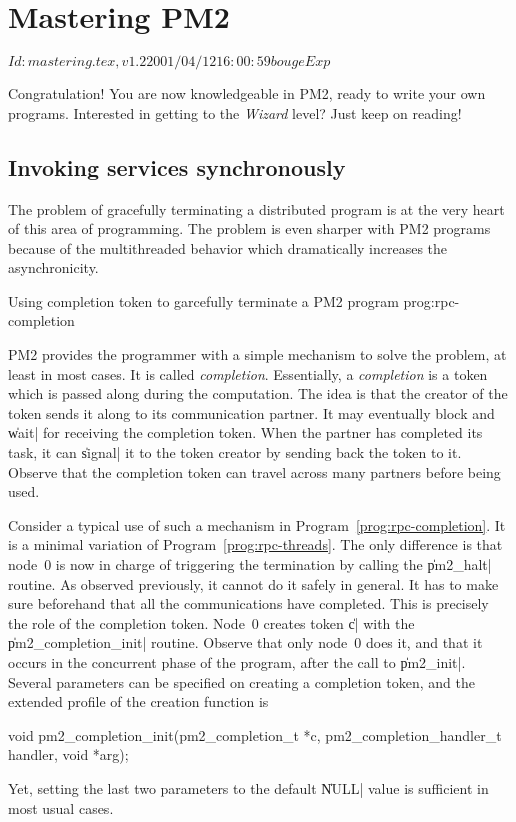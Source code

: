 \chapter{Mastering PM2}

\stamp $Id: mastering.tex,v 1.2 2001/04/12 16:00:59 bouge Exp $

Congratulation! You are now knowledgeable in PM2, ready to write your
own programs.  Interested in getting to the \emph{Wizard} level? Just
keep on reading!

\section{Invoking services synchronously}

The problem of gracefully terminating a distributed program is at the
very heart of this area of programming. The problem is even sharper
with PM2 programs because of the multithreaded behavior which
dramatically increases the asynchronicity.

 {Using completion token to
  garcefully terminate a PM2 program} {prog:rpc-completion}

PM2 provides the programmer with a simple mechanism to solve the
problem, at least in most cases. It is called \emph{completion}.
Essentially, a \emph{completion} is a token which is passed along
during the computation. The idea is that the creator of the token
sends it along to its communication partner. It may eventually block and
\|wait| for receiving the completion token. When the partner has
completed its task, it can \|signal| it to the token creator by
sending back the token to it. Observe that the completion token can
travel across many partners before being used. 

Consider a typical use of such a mechanism in
Program~\ref{prog:rpc-completion}. It is a minimal variation of
Program~\ref{prog:rpc-threads}. The only difference is that node~0 is now
in charge of triggering the termination by calling the \|pm2_halt|
routine. As observed previously, it cannot do it safely in general.
It has to make sure beforehand that all the communications have
completed. This is precisely the role of the completion token. Node~0
creates token \|c| with the \|pm2_completion_init| routine. Observe
that only node~0 does it, and that it occurs in the concurrent phase
of the program, after the call to \|pm2_init|. Several parameters can
be specified on creating a completion token, and the extended profile of
the creation function is
\begin{program}
void pm2_completion_init(pm2_completion_t *c,
                         pm2_completion_handler_t handler,
                         void *arg);
\end{program}
Yet, setting the last two parameters to the default \|NULL| value is
sufficient in most usual cases. 

